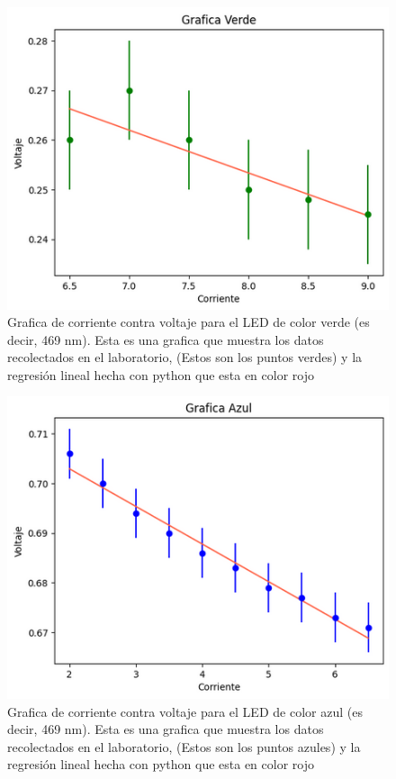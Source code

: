 \documentclass[a4paper, amsfonts, amssymb, amsmath, reprint, showkeys, nofootinbib, twoside]{revtex4-1}
\begin{document}
\begin{figure}[H]
   \centering
   \includegraphics[scale=0.3]{Grafica_Verde.png}
   \caption{Grafica de corriente contra voltaje para el LED de color verde (es decir, 469 nm). Esta es una grafica que muestra los datos recolectados en el laboratorio, (Estos son los puntos verdes) y la regresión lineal hecha con python que esta en color rojo}
\end{figure}
\begin{figure}[H]
   \centering
   \includegraphics[scale=0.3]{Grafica_Azul.png}
   \caption{Grafica de corriente contra voltaje para el LED de color azul (es decir, 469 nm). Esta es una grafica que muestra los datos recolectados en el laboratorio, (Estos son los puntos azules) y la regresión lineal hecha con python que esta en color rojo}
\end{figure}
\end{document}
